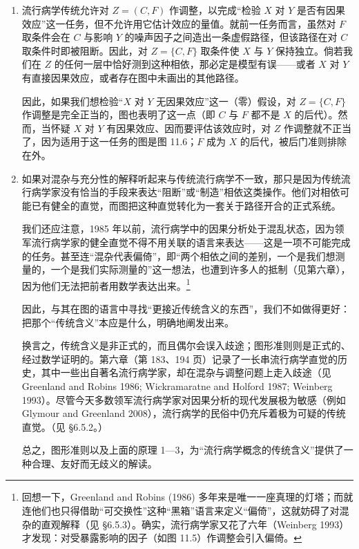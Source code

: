 \begin{enumerate}[label=\arabic*.]
\item 流行病学传统允许对 $Z=(C,F)$ 作调整，以完成“检验 $X$ 对 $Y$ 是否有因果效应”这一任务，但不允许用它估计效应的量值。就前一任务而言，虽然对 $F$ 取条件会在 $C$ 与影响 $Y$ 的噪声因子之间造出一条虚假路径，但该路径在对 $C$ 取条件时即被阻断。因此，对 $Z=\{C,F\}$ 取条件使 $X$ 与 $Y$ 保持独立。倘若我们在 $Z$ 的任何一层中恰好测到这种相依，那必定是模型有误——或者 $X$ 对 $Y$ 有直接因果效应，或者存在图中未画出的其他路径。

因此，如果我们想检验“$X$ 对 $Y$ 无因果效应”这一（零）假设，对 $Z=\{C,F\}$ 作调整是完全正当的，图也表明了这一点（即 $C$ 与 $F$ 都不是 $X$ 的后代）。然而，当怀疑 $X$ 对 $Y$ 有因果效应、因而要评估该效应时，对 $Z$ 作调整就不正当了，因为适用于这一任务的图是图 11.6；$F$ 成为 $X$ 的后代，被后门准则排除在外。

\item 如果对混杂与充分性的解释听起来与传统流行病学不一致，那只是因为传统流行病学家没有恰当的手段来表达“阻断”或“制造”相依这类操作。他们对相依可能已有健全的直觉，而图把这种直觉转化为一套关于路径开合的正式系统。

我们还应注意，1985 年以前，流行病学中的因果分析处于混乱状态，因为领军流行病学家的健全直觉不得不用关联的语言来表达——这是一项不可能完成的任务。甚至连“混杂代表偏倚”，即“两个相依之间的差别，一个是我们想测量的，一个是我们实际测量的”这一想法，也遭到许多人的抵制（见第六章），因为他们无法把前者用数学表达出来。\footnote{回想一下，Greenland and Robins (1986) 多年来是唯一一座真理的灯塔；而就连他们也只得借助“可交换性”这种“黑箱”语言来定义“偏倚”，这就妨碍了对混杂的直观解释（见 \S 6.5.3）。确实，流行病学家又花了六年（Weinberg 1993）才发现：对受暴露影响的因子（如图 11.5）作调整会引入偏倚。}

因此，与其在图的语言中寻找“更接近传统含义的东西”，我们不如做得更好：把那个“传统含义”本应是什么，明确地阐发出来。

换言之，传统含义是非正式的，而且偶尔会误入歧途；图形准则则是正式的、经过数学证明的。第六章（第 183、194 页）记录了一长串流行病学直觉的历史，其中一些出自著名流行病学家，却在混杂与调整问题上走入歧途（见 Greenland and Robins 1986; Wickramaratne and Holford 1987; Weinberg 1993）。尽管今天多数领军流行病学家对因果分析的现代发展极为敏感（例如 Glymour and Greenland 2008），流行病学的民俗中仍充斥着极为可疑的传统直觉。（见 \S 6.5.2。）

总之，图形准则以及上面的原理 1—3，为“流行病学概念的传统含义”提供了一种合理、友好而无歧义的解读。
\end{enumerate}

